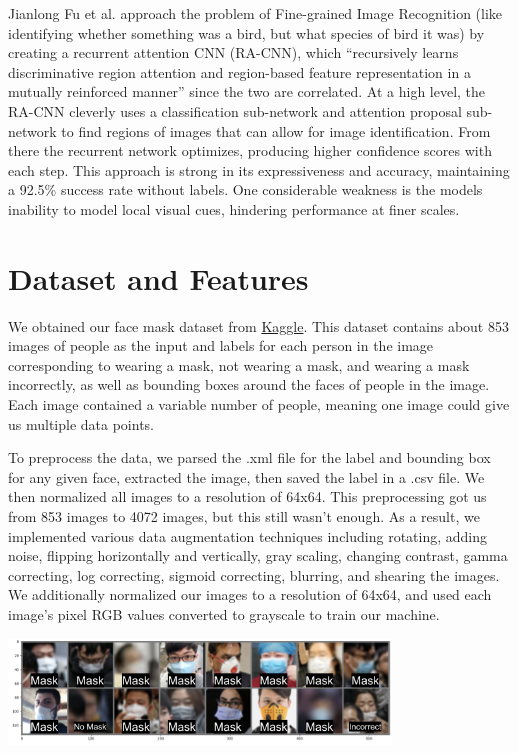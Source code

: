 \documentclass{article}
\begin{document}
Jianlong Fu et al. \cite{Fu_2017_CVPR} approach the problem of Fine-grained Image Recognition (like identifying whether something was a bird, but what species of bird it was) by creating a recurrent attention CNN (RA-CNN), which “recursively learns discriminative region attention and region-based feature representation in a mutually reinforced manner” since the two are correlated. At a high level, the RA-CNN cleverly uses a classification sub-network and attention proposal sub-network to find regions of images that can allow for image identification. From there the recurrent network optimizes, producing higher confidence scores with each step. This approach is strong in its expressiveness and accuracy, maintaining a 92.5\% success rate without labels. One considerable weakness is the models inability to model local visual cues, hindering performance at finer scales.

\section{Dataset and Features}
We obtained our face mask dataset from \href{https://www.kaggle.com/andrewmvd/face-mask-detection}{Kaggle}\cite{dataset}. This dataset contains about 853 images of people as the input and labels for each person in the image corresponding to wearing a mask, not wearing a mask, and wearing a mask incorrectly, as well as bounding boxes around the faces of people in the image. Each image contained a variable number of people, meaning one image could give us multiple data points.

To preprocess the data, we parsed the .xml file for the label and bounding box for any given face, extracted the image, then saved the label in a .csv file. We then normalized all images to a resolution of 64x64. This preprocessing got us from 853 images to 4072 images, but this still wasn’t enough. As a result, we implemented various data augmentation techniques including rotating, adding noise, flipping horizontally and vertically, gray scaling, changing contrast, gamma correcting, log correcting, sigmoid correcting, blurring, and shearing the images. We additionally normalized our images to a resolution of 64x64, and used each image’s pixel RGB values converted to grayscale to train our machine.

\begin{center}
  \includegraphics[width=4in]{../images/data.png}
\end{center}
\end{document}
